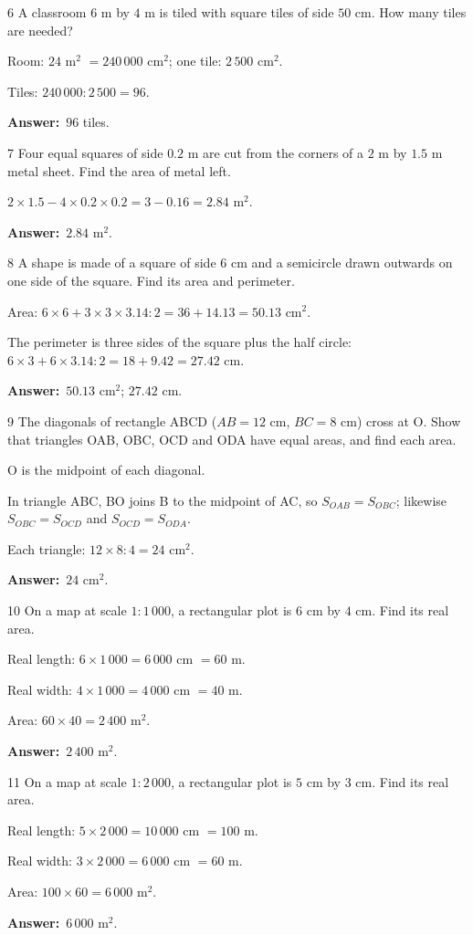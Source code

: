 \documentclass[11pt]{article}
\newif\ifsol \solfalse
\providecommand{\AnsWord}{Đáp số}
\newcommand{\dapso}[1]{\par\textbf{\AnsWord:}\ #1}
\newcommand{\probsol}[1]{%
  \begin{lrbox}{\solmeasure}\begin{minipage}{\dimexpr\linewidth-24pt\relax}#1\end{minipage}\end{lrbox}%
  \ifsol
    \begin{solbox}#1\end{solbox}%
  \else
    \setlength{\solht}{\dimexpr\ht\solmeasure+\dp\solmeasure+0.85cm\relax}%
    \ifdim\solht<1.35cm\setlength{\solht}{1.35cm}\fi
    \begin{tcolorbox}[colback=white,colframe=Line,boxrule=0.8pt,arc=5pt,
      left=8pt,right=8pt,top=4pt,bottom=4pt,height=\solht]{\footnotesize\color{Slate}\itshape\WorkWord}\end{tcolorbox}%
  \fi}
\newcommand{\gap}{\vspace{0.3cm}}
\def\WorkWord{Your work:}
\def\AnsWord{Answer}
\begin{document}
\gap
\begin{probbox}{6}{\relax}
A classroom $6$ m by $4$ m is tiled with square tiles of side $50$ cm. How many tiles are needed?
\end{probbox}
\probsol{
Room: $24$ m$^2$ $=240\,000$ cm$^2$; one tile: $2\,500$ cm$^2$.\par Tiles: $240\,000:2\,500=96$.
\dapso{$96$ tiles.}}
\gap
\begin{probbox}{7}{\relax}
Four equal squares of side $0.2$ m are cut from the corners of a $2$ m by $1.5$ m metal sheet. Find the area of metal left.
\end{probbox}
\probsol{
$2\times1.5-4\times0.2\times0.2=3-0.16=2.84$ m$^2$.
\dapso{$2.84$ m$^2$.}}
\gap
\begin{probbox}{8}{\relax}
A shape is made of a square of side $6$ cm and a semicircle drawn outwards on one side of the square. Find its area and perimeter.
\end{probbox}
\probsol{
Area: $6\times6+3\times3\times3.14:2=36+14.13=50.13$ cm$^2$.\par
The perimeter is three sides of the square plus the half circle: $6\times3+6\times3.14:2=18+9.42=27.42$ cm.
\dapso{$50.13$ cm$^2$; $27.42$ cm.}}
\gap
\begin{probbox}{9}{\relax}
The diagonals of rectangle ABCD ($AB=12$ cm, $BC=8$ cm) cross at O. Show that triangles OAB, OBC, OCD and ODA have equal areas, and find each area.
\end{probbox}
\probsol{
O is the midpoint of each diagonal.\par In triangle ABC, BO joins B to the midpoint of AC, so $S_{OAB}=S_{OBC}$; likewise $S_{OBC}=S_{OCD}$ and $S_{OCD}=S_{ODA}$.\par
Each triangle: $12\times8:4=24$ cm$^2$.
\dapso{$24$ cm$^2$.}}
\gap
\begin{probbox}{10}{\relax}
On a map at scale $1:1\,000$, a rectangular plot is $6$ cm by $4$ cm. Find its real area.
\end{probbox}
\probsol{
Real length: $6\times1\,000=6\,000$ cm $=60$ m.\par Real width: $4\times1\,000=4\,000$ cm $=40$ m.\par Area: $60\times40=2\,400$ m$^2$.
\dapso{$2\,400$ m$^2$.}}
\gap
\begin{probbox}{11}{\relax}
On a map at scale $1:2\,000$, a rectangular plot is $5$ cm by $3$ cm. Find its real area.
\end{probbox}
\probsol{
Real length: $5\times2\,000=10\,000$ cm $=100$ m.\par Real width: $3\times2\,000=6\,000$ cm $=60$ m.\par Area: $100\times60=6\,000$ m$^2$.
\dapso{$6\,000$ m$^2$.}}
\end{document}
